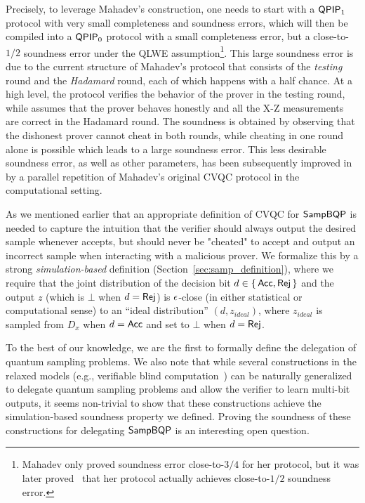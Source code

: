 Precisely, to leverage Mahadev's construction, one needs to start with a $\operatorname{\mathsf{QPIP}}_1$ protocol with very small completeness and soundness errors, which will then be compiled into a $\operatorname{\mathsf{QPIP}}_0$ protocol with a small completeness error, but a close-to-$1/2$ soundness error under the QLWE assumption\footnote{Mahadev only proved soundness error close-to-$3/4$ for her protocol, but it was later proved~\cite{arXiv:ChiaChungYam19, arXiv:AlaChiHun19} that her protocol actually achieves close-to-$1/2$ soundness error.}.  
This large soundness error is due to the current structure of Mahadev's protocol that consists of the \emph{testing} round and the \emph{Hadamard} round, each of which happens with a half chance. 
At a high level, the protocol verifies the behavior of the prover in the testing round, while assumes that the prover behaves honestly and all the X-Z measurements are correct in the Hadamard round. 
The soundness is obtained by observing that the dishonest prover cannot cheat in both rounds, while cheating in one round alone is possible which leads to a large soundness error. 
This less desirable soundness error, as well as other parameters, has been subsequently improved in \cite{arXiv:AlaChiHun19, arXiv:ChiaChungYam19} by a parallel repetition of Mahadev's original CVQC protocol in the computational setting. 

As we mentioned earlier that an appropriate definition of CVQC for $\operatorname{\mathsf{SampBQP}}$ is needed to capture the intuition that the verifier should always output the desired sample whenever accepts, but should never be "cheated" to accept and output an incorrect sample when interacting with a malicious prover. We formalize this by a strong \emph{simulation-based} definition (Section~\ref{sec:samp_definition}), where we require that the joint distribution of the decision bit $d \in \set{\mathsf{Acc}, \mathsf{Rej}}$ and the output $z$ (which is $\bot$ when $d = \mathsf{Rej}$) is $\epsilon$-close (in  either statistical or computational sense) to an ``ideal distribution'' $(d,z_{ideal})$, where $z_{ideal}$ is sampled from $D_x$ when $d = \mathsf{Acc}$ and set to $\bot$ when $d = \mathsf{Rej}$.

To the best of our knowledge, we are the first to formally define the delegation of quantum sampling problems. We also note that while several constructions in the relaxed models (e.g., verifiable blind computation~\cite{FK17}) can be naturally generalized to delegate quantum sampling problems and allow the verifier to learn multi-bit outputs, it seems non-trivial to show that these constructions achieve the simulation-based soundness property we defined. Proving the soundness of these constructions for delegating $\operatorname{\mathsf{SampBQP}}$ is an interesting open question.

